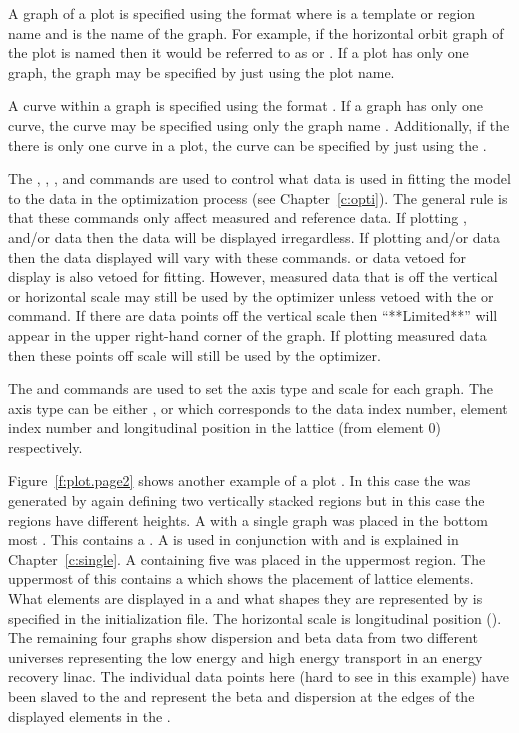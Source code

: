 A graph of a plot is specified using the format
 where  is a template or region
name and  is the name of the graph. For example, if the
horizontal orbit graph of the  plot is named  then it
would be referred to as  or . If a plot has only
one graph, the graph may be specified by just using the plot name.

A curve within a graph is specified using the format
. If a graph has only one curve,
the curve may be specified using only the graph name
. Additionally, if the there is only one
curve in a plot, the curve can be specified by just using the
.

The , , , and  commands are used
to control what data is used in fitting the model to the data in the
optimization process (see Chapter~\ref{c:opti}). The general rule is
that these commands only affect measured and reference data. If
plotting ,  and/or  data then the data
will be displayed irregardless. If plotting  and/or  data
then the data displayed will vary with these commands.   or
 data vetoed for display is also vetoed for fitting.  However,
measured data that is off the vertical or horizontal scale may still be
used by the optimizer unless vetoed with the  or 
command.  If there are data points off the vertical scale then
``**Limited**'' will appear in the upper right-hand corner of the
graph. If plotting measured data then these points off scale will
still be used by the optimizer.

The  and  commands are used to set the axis
type and scale for each graph. The axis type can be either ,
 or  which corresponds to the data index number,
element index number and longitudinal position in the lattice (from
element 0) respectively.

Figure~\ref{f:plot.page2} shows another example of a plot .
In this case the  was generated by again defining two
vertically stacked regions but in this case the regions have different
heights.  A  with a single graph was placed in the
bottom most .  This  contains a .
A  is used in conjunction with  and is
explained in Chapter~\ref{c:single}. A  containing
five  was placed in the uppermost region. The uppermost
 of this  contains a  which
shows the placement of lattice elements.  What elements are displayed
in a  and what shapes they are represented by is
specified in the initialization file. The horizontal scale is
longitudinal position ().  The remaining four graphs show
dispersion and beta data from two different universes representing the
low energy and high energy transport in an energy recovery linac. The
individual data points here (hard to see in this example) have been
slaved to the  and represent the beta and dispersion at
the edges of the displayed elements in the .


